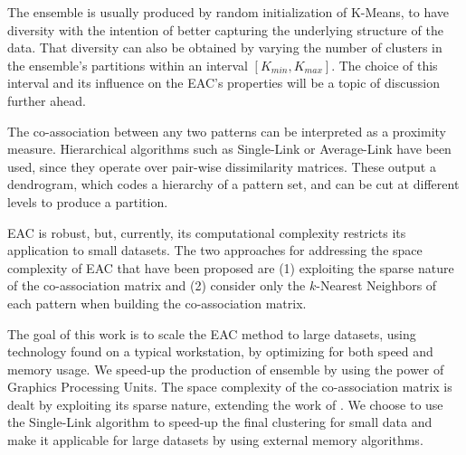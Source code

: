 The ensemble is usually produced by random initialization of K-Means, %
to have diversity with the intention of better capturing the underlying structure of the data.  That diversity can also be obtained by varying the number of clusters in the ensemble's partitions within an interval $[K_{min}, K_{max}]$.
The choice of this interval and its influence on the EAC's properties will be a topic of discussion further ahead.


The co-association between any two patterns can be interpreted as a proximity measure.
Hierarchical algorithms such as Single-Link or Average-Link have been used, since they operate over pair-wise dissimilarity matrices.
These output a dendrogram, which codes a hierarchy of a pattern set, and can be cut at different levels to produce a partition.

EAC is robust, but, currently, its computational complexity restricts its application to small datasets.
The two approaches for addressing the space complexity of EAC that have been proposed are (1) exploiting the sparse nature of the co-association matrix \cite{Lourenco2010} and (2) consider only the $k$-Nearest Neighbors of each pattern when building the co-association matrix.

The goal of this work is to scale the EAC method to large datasets, using technology found on a typical workstation, by optimizing for both speed and memory usage.
We speed-up the production of ensemble by using the power of Graphics Processing Units.
The space complexity of the co-association matrix is dealt by exploiting its sparse nature, extending the work of \cite{Lourenco2010}.
We choose to use the Single-Link algorithm to speed-up the final clustering for small data and make it applicable for large datasets by using external memory algorithms.

